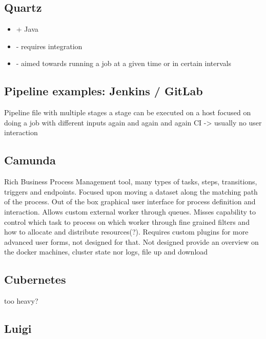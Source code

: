 \subsection{Quartz}

\cite{quartz:main}
\cite{quartz:overview}

\begin{itemize}
	\item + Java
	\item - requires integration
	\item - aimed towards running a job at a given time or in certain intervals
\end{itemize}

\subsection{Pipeline examples: Jenkins / GitLab}

Pipeline file with multiple stages
a stage can be executed on a host
focused on doing a job with different inputs again and again and again
CI -> usually no user interaction

\subsection{Camunda}

\cite{camunda:main}
\cite{camunda:process_engine_api}
\cite{camunda:rest_api_reference}

Rich Business Process Management tool, many types of tasks, steps, transitions, triggers and endpoints.
Focused upon moving a dataset along the matching path of the process.
Out of the box graphical user interface for process definition and interaction.
Allows custom external worker through queues.
Misses capability to control which task to process on which worker through fine grained filters and how to allocate and distribute resources(?).
Requires custom plugins for more advanced user forms, not designed for that.
Not designed provide an overview on the docker machines, cluster state nor logs, file up and download

\subsection{Cubernetes}

too heavy?

\subsection{Luigi}

